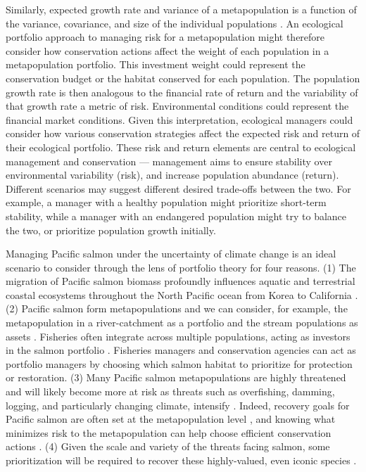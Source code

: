 Similarly, expected growth rate and variance of a metapopulation is a function of the variance, covariance, and size of the individual populations \citep{moore2010, carlson2011, anderson2013}. An ecological portfolio approach to managing risk for a metapopulation might therefore consider how conservation actions affect the weight of each population in a metapopulation portfolio. This investment weight could represent the conservation budget or the habitat conserved for each population. The population growth rate is then analogous to the financial rate of return and the variability of that growth rate a metric of risk. Environmental conditions could represent the financial market conditions. Given this interpretation, ecological managers could consider how various conservation strategies affect the expected risk and return of their ecological portfolio. These risk and return elements are central to ecological management and conservation --- management aims to ensure stability over environmental variability (risk), and increase population abundance (return). Different scenarios may suggest different desired trade-offs between the two. For example, a manager with a healthy population might prioritize short-term stability, while a manager with an endangered population might try to balance the two, or prioritize population growth initially.

Managing Pacific salmon under the uncertainty of climate change is an ideal scenario to consider through the lens of portfolio theory for four reasons. (1) The migration of Pacific salmon biomass profoundly influences aquatic and terrestrial coastal ecosystems throughout the North Pacific ocean from Korea to California \citep{quinn2005}. (2) Pacific salmon form metapopulations \citep[e.g.][]{policansky1998, cooper1999, schtickzelle2007} and we can consider, for example, the metapopulation in a river-catchment as a portfolio and the stream populations as assets \citep{schindler2010, moore2010, carlson2011, anderson2013, yeakel2014}. Fisheries often integrate across multiple populations, acting as investors in the salmon portfolio \citep{hilborn2003}. Fisheries managers and conservation agencies can act as portfolio managers by choosing which salmon habitat to prioritize for protection or restoration. (3) Many Pacific salmon metapopulations are highly threatened \citep[e.g.][]{gustafson2007} and will likely become more at risk as threats such as overfishing, damming, logging, and particularly changing climate, intensify \citep[e.g.][]{lackey2003}. Indeed, recovery goals for Pacific salmon are often set at the metapopulation level \citep{mcelhany2000}, and knowing what minimizes risk to the metapopulation can help choose efficient conservation actions \citep{policansky1998, mcelhany2000}. (4) Given the scale and variety of the threats facing salmon, some prioritization will be required to recover these highly-valued, even iconic species \citep{allendorf1997, ruckelshaus2002}.

